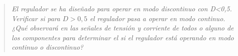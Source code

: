 \begin{quote} \textit{El regulador se ha diseñado para operar en modo discontinuo con D<0,5. Verificar si para $D>0,5$ el regulador pasa a operar en modo continuo. ¿Qué observará en las señales de tensión y corriente de todos o alguno de los componentes para determinar el si el regulador está operando en modo continuo o discontinuo?}
\end{quote}
